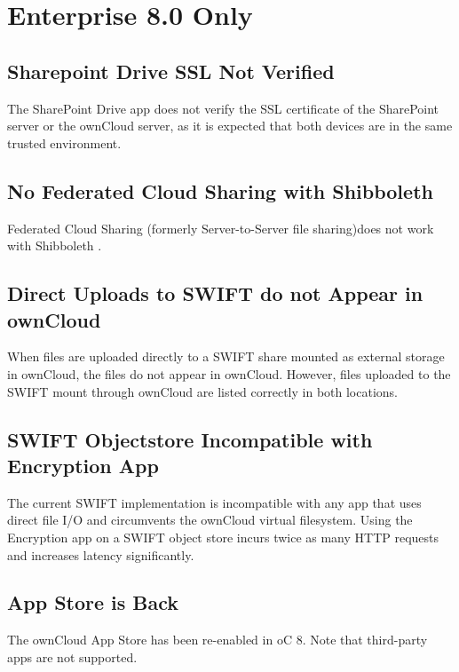 \documentclass[letterpaper,10pt,english]{sphinxmanual}
\begin{document}
\section{Enterprise 8.0 Only}
\label{release_notes:enterprise-8-0-only}

\subsection{Sharepoint Drive SSL Not Verified}
\label{release_notes:sharepoint-drive-ssl-not-verified}
The SharePoint Drive app does not verify the SSL certificate of the SharePoint
server or the ownCloud server, as it is expected that both devices are in the
same trusted environment.


\subsection{No Federated Cloud Sharing with Shibboleth}
\label{release_notes:no-federated-cloud-sharing-with-shibboleth}
Federated Cloud Sharing (formerly Server-to-Server file sharing)does not work
with Shibboleth .


\subsection{Direct Uploads to SWIFT do not Appear in ownCloud}
\label{release_notes:direct-uploads-to-swift-do-not-appear-in-owncloud}
When files are uploaded directly to a SWIFT share mounted as external storage
in ownCloud, the files do not appear in ownCloud. However, files uploaded to
the SWIFT mount through ownCloud are listed correctly in both locations.


\subsection{SWIFT Objectstore Incompatible with Encryption App}
\label{release_notes:swift-objectstore-incompatible-with-encryption-app}
The current SWIFT implementation is incompatible with any app that uses direct
file I/O and circumvents the ownCloud virtual filesystem. Using the Encryption
app on a SWIFT object store incurs twice as many HTTP requests and increases
latency significantly.


\subsection{App Store is Back}
\label{release_notes:app-store-is-back}
The ownCloud App Store has been re-enabled in oC 8. Note that third-party apps
are not supported.
\end{document}
